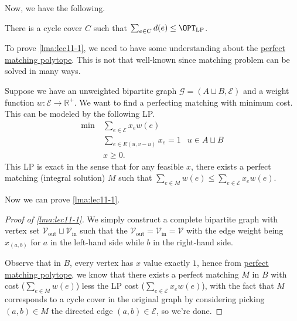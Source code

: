 Now, we have the following.

\begin{lemma}\label{lma:lec11-1}
	There is a cycle cover \(C\) such that \(\sum_{e\in C} d(e) \leq \OPT_{\mathrm{LP} }\).
\end{lemma}

To prove \autoref{lma:lec11-1}, we need to have some understanding about the \hyperref[rmk:perfect-matching-polytope]{perfect matching polytope}. This is not that well-known since matching problem can be solved in many ways.

\begin{remark}\label{rmk:perfect-matching-polytope}
	Suppose we have an unweighted bipartite graph \(\mathcal{G} =(A \sqcup B, \mathcal{E} )\) and a weight function \(w\colon \mathcal{E} \to \mathbb{R} ^+\). We want to find a perfecting matching with minimum cost. This can be modeled by the following LP.
	\[
		\begin{aligned}
			\min~ & \sum_{e\in \mathcal{E} } x_e w(e)                  \\
			      & \sum_{e\in E(u, v-u)} x_e = 1     & u\in A\sqcup B \\
			      & x\geq 0.
		\end{aligned}
	\]
	This LP is exact in the sense that for any feasible \(x\), there exists a perfect matching (integral solution) \(M\) such that \(\sum_{e\in M} w(e) \leq \sum_{e\in \mathcal{E}} x_e w(e)\).
\end{remark}

\vspace*{1em}
Now we can prove \autoref{lma:lec11-1}.
\begin{proof}[Proof of \autoref{lma:lec11-1}]
	We simply construct a complete bipartite graph with vertex set \(\mathcal{V}_{\text{out}} \sqcup \mathcal{V}_{\text{in} }\) such that the \(\mathcal{V} _{\text{out} }= \mathcal{V} _{\text{in} }= \mathcal{V} \) with the edge weight being \(x_{(a, b)}\) for \(a\) in the left-hand side while \(b\) in the right-hand side.

	Observe that in \(B\), every vertex has \(x\) value exactly \(1\), hence from \hyperref[rmk:perfect-matching-polytope]{perfect matching polytope}, we know that there exists a perfect matching \(M\) in \(B\) with cost (\(\sum_{e\in M} w(e)\)) less the LP cost (\(\sum_{e\in \mathcal{E} } x_e w(e)\)), with the fact that \(M\) corresponds to a cycle cover in the original graph by considering picking \((a, b)\in M\) the directed edge \((a, b)\in \mathcal{E} \),  so we're done.
\end{proof}

